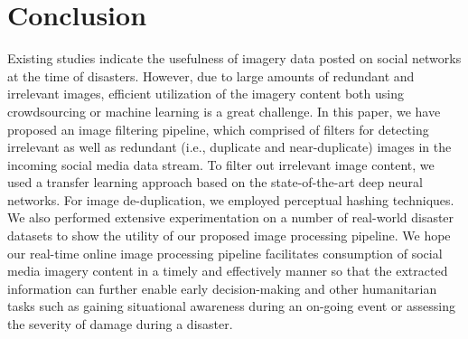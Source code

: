 \documentclass{iscram}
\begin{document}
\section{Conclusion}%

Existing studies indicate the usefulness of imagery data posted on social networks at the time of disasters. However, due to large amounts of redundant and irrelevant images, efficient utilization of the imagery content both using crowdsourcing or machine learning is a great challenge. In this paper, we have proposed an image filtering pipeline, which comprised of filters for detecting irrelevant as well as redundant (i.e., duplicate and near-duplicate) images in the incoming social media data stream. To filter out irrelevant image content, we used a transfer learning approach based on the state-of-the-art deep neural networks. For image de-duplication, we employed perceptual hashing techniques. We also performed extensive experimentation on a number of real-world disaster datasets to show the utility of our proposed image processing pipeline. We hope our real-time online image processing pipeline facilitates consumption of social media imagery content in a timely and effectively manner so that the extracted information can further enable early decision-making and other humanitarian tasks such as gaining situational awareness during an on-going event or assessing the severity of damage during a disaster.



\printbibliography
 
\end{document}
